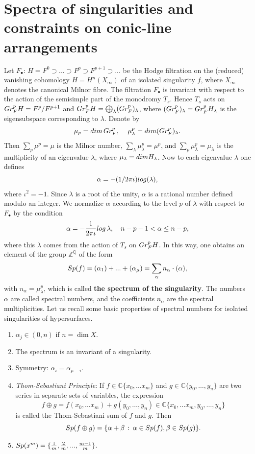 \documentclass[12pt]{amsart}
\theoremstyle{plain}
\theoremstyle{definition}
\numberwithin{equation}{section}
\begin{document}
\section{Spectra of singularities and constraints on conic-line arrangements}
Let  $F_{\bullet}: \, H = F^{0} \supset ... \supset F^{p} \supset F^{p+1} \supset ...$ be the Hodge filtration on the (reduced) vanishing cohomology $H = H^{n}(X_{\infty})$ of an isolated singularity $f$, where $X_{\infty}$ denotes the canonical Milnor fibre. The filtration $F_{\bullet}$ is invariant with respect to the action of the semisimple part of the monodromy $T_{s}$. Hence $T_{s}$ acts on ${\rm Gr}_{F}^{p}H = F^{p}/F^{p+1}$ and ${\rm Gr}_{F}^{p}H = \bigoplus_{\lambda} ({\rm Gr}_{F}^{p})_{\lambda}$, where $({\rm Gr}_{F}^{p})_{\lambda} = {\rm Gr}_{F}^{p}H_{\lambda}$ is the eigensubspace corresponding to $\lambda$. Denote by
$$\mu_{p} = {\rm dim} \, {\rm Gr}_{F}^{p},\, \quad \mu_{\lambda}^{p} = {\rm dim} ({\rm Gr}_{F}^{p})_{\lambda}.$$
Then $\sum_{p} \mu^{p} = \mu$ is the Milnor number, $\sum_{\lambda} \mu_{\lambda}^{p} = \mu^{p}$, and $\sum_{p}\mu_{\lambda}^{p} = \mu_{\lambda}$ is the multiplicity of an eigenvalue $\lambda$, where $\mu_{\lambda} = {\rm dim} H_{\lambda}$.  Now to each eigenvalue $\lambda$ one defines 
$$\alpha = -(1/2\pi\iota){\rm log}(\lambda),$$
where $\iota^2=-1$. Since $\lambda$ is a root of the unity, $\alpha$ is a rational number defined modulo an integer. We normalize $\alpha$ according to the level $p$ of $\lambda$ with respect to $F_{\bullet}$ by the condition
$$\alpha = - \frac{1}{2\pi \iota} {\rm log} \, \lambda, \quad n-p-1 < \alpha \leq n-p,$$
where this $\lambda$ comes from the action of $T_s$ on ${\rm Gr}_{F}^{p}H$.
In this way, one obtains an element of the group $\mathbb{Z}^{\mathbb{Q}}$ of the form
$${\rm Sp}(f) = (\alpha_{1}) + ... + (\alpha_{\mu}) = \sum_{\alpha} n_{\alpha}\cdot (\alpha),$$
with $n_{\alpha} = \mu_{\lambda}^{p}$, which is called \textbf{the spectrum of the singularity}. The numbers $\alpha$ are called spectral numbers, and the coefficients $n_{\alpha} $ are the spectral multiplicities. Let us recall some basic properties of spectral numbers for isolated singularities of hypersurfaces.
\begin{enumerate}
\item $\alpha_{j} \in (0,n)$ if $n= \dim X$.
\item The spectrum is an invariant of a singularity.
\item Symmetry: $\alpha_{i} = \alpha_{\mu - i}$.
\item \emph{Thom-Sebastiani Principle}: If $f \in \mathbb{C}\{x_{0}, \ldots x_{m}\}$ and $g \in \mathbb{C}\{y_{0}, \ldots, y_{n}\}$ are two series in separate sets of variables, the expression
$$f \oplus g = f(x_{0}, \ldots x_{m}) + g(y_{0}, \ldots, y_{n}) \in \mathbb{C}\{x_{0}, \ldots x_{m},y_{0}, \ldots, y_{n}\}$$ is called the Thom-Sebastiani sum of $f$ and $g$. Then
$${\rm Sp}(f\oplus g) = \{ \alpha + \beta \, : \, \alpha \in {\rm Sp}(f), \beta\in {\rm Sp}(g)\}.$$
\item ${\rm Sp}(x^{m}) = \{ \frac{1}{m}, \frac{2}{m}, ..., \frac{m-1}{m}\}.$
\end{enumerate}
\end{document}
